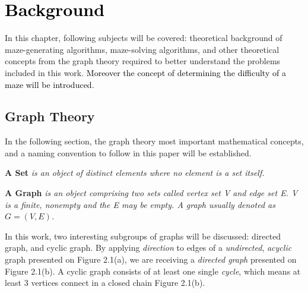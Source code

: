 \chapter{\textcolor{black}{Background}}
In this chapter, following subjects will be covered: theoretical background of maze-generating algorithms, maze-solving algorithms,
and other theoretical concepts from the graph theory required to better understand the problems included in this work. \textcolor{black}{Moreover the concept of determining the difficulty
of a maze will be introduced}. 
\section{Graph Theory}
In the following section, the graph theory most important mathematical concepts, and a naming convention to follow in this paper will be established. 
\begin{definition}\textbf{A Set} \emph{is an object of distinct elements where no element is a set itself.}\cite{5}\end{definition}
\begin{definition}\textbf{A Graph} \emph{is an object comprising two sets called vertex set V and edge set E. V is a finite, nonempty and the E may be empty. A graph usually denoted as $ G = (V, E)$\cite{5}.}\end{definition}
\noindent In this work, two interesting subgroups of graphs will be discussed: directed graph, and cyclic graph. By applying \textit{direction} to edges of a \textit{undirected}, \textit{acyclic} graph presented on Figure 2.1(a), we are receiving a \textit{directed graph} presented on Figure 2.1(b). A cyclic graph consists of at least one single \textit{cycle}, which means at least 3 vertices connect in a closed chain Figure 2.1(b). 

